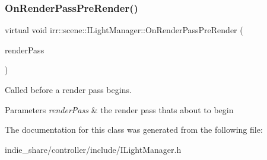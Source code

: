 \subsubsection{\texorpdfstring{On\+Render\+Pass\+Pre\+Render()}{OnRenderPassPreRender()}}
{\footnotesize\ttfamily virtual void irr\+::scene\+::\+I\+Light\+Manager\+::\+On\+Render\+Pass\+Pre\+Render (\begin{DoxyParamCaption}\item[{\hyperlink{namespaceirr_1_1scene_a7862269bd1abc123929d4dbb8200d67f}{E\+\_\+\+S\+C\+E\+N\+E\+\_\+\+N\+O\+D\+E\+\_\+\+R\+E\+N\+D\+E\+R\+\_\+\+P\+A\+SS}}]{render\+Pass }\end{DoxyParamCaption})\hspace{0.3cm}{\ttfamily [pure virtual]}}



Called before a render pass begins. 


\begin{DoxyParams}{Parameters}
{\em render\+Pass} & the render pass that\textquotesingle{}s about to begin \\
\hline
\end{DoxyParams}


The documentation for this class was generated from the following file\+:\begin{DoxyCompactItemize}
\item 
indie\+\_\+share/controller/include/I\+Light\+Manager.\+h\end{DoxyCompactItemize}
